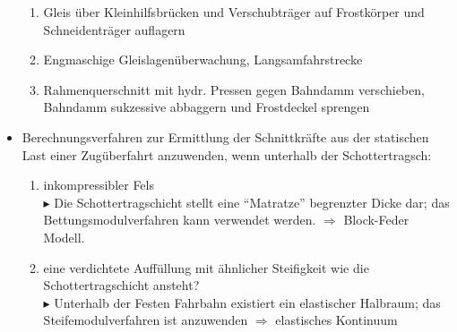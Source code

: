 \documentclass[fleqn,twoside]{article}
\begin{document}
\begin{itemize}
\begin{enumerate}
            \item Gleis über Kleinhilfsbrücken und Verschubträger auf Frostkörper und Schneidenträger auflagern
            \item Engmaschige Gleislagenüberwachung, Langsamfahrstrecke
            \item Rahmenquerschnitt mit hydr. Pressen gegen Bahndamm verschieben, Bahndamm sukzessive abbaggern und Frostdeckel sprengen
        \end{enumerate}
    \item Berechnungsverfahren zur Ermittlung der Schnittkräfte aus der statischen Last einer Zugüberfahrt anzuwenden, wenn unterhalb der Schottertragsch:
        \begin{enumerate}[label=(\alph*)]
            \item inkompressibler Fels\\
            $\blacktriangleright$ Die Schottertragschicht stellt eine \enquote{Matratze} begrenzter Dicke dar; das Bettungsmodulverfahren kann verwendet werden. $\Rightarrow$ Block-Feder Modell.
            \item eine verdichtete Auffüllung mit ähnlicher Steifigkeit wie die Schottertragschicht ansteht?\\
            $\blacktriangleright$ Unterhalb der Festen Fahrbahn existiert ein elastischer Halbraum; das Steifemodulverfahren ist anzuwenden $\Rightarrow$ elastisches Kontinuum
        \end{enumerate}


\end{itemize}
\end{document}
